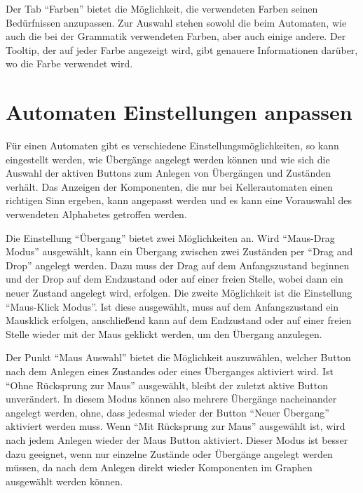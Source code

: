 Der Tab "`Farben"' bietet die Möglichkeit, die verwendeten Farben seinen
Be\-dürf\-nis\-sen anzupassen. Zur Auswahl stehen sowohl die beim Automaten, wie
auch die bei der Grammatik verwendeten Farben, aber auch einige andere. Der
Tooltip, der auf jeder Farbe angezeigt wird, gibt genauere Informationen
darüber, wo die Farbe verwendet wird.


\section{Automaten Einstellungen anpassen}

Für einen Automaten gibt es verschiedene Einstellungsmöglichkeiten, so kann
eingestellt werden, wie Übergänge angelegt werden können und wie sich die
Auswahl der aktiven Buttons zum Anlegen von Übergängen und Zuständen verhält.
Das Anzeigen der Komponenten, die nur bei Kellerautomaten einen richtigen Sinn
ergeben, kann angepasst werden und es kann eine Vorauswahl des verwendeten
Alphabetes getroffen werden.\vspace{10pt}

Die Einstellung "`Übergang"' bietet zwei Möglichkeiten an. Wird "`Maus-Drag Modus"'
ausgewählt, kann ein Übergang zwischen zwei Zuständen per "`Drag and Drop"' angelegt
werden. Dazu muss der Drag auf dem Anfangszustand beginnen und der Drop auf dem
Endzustand oder auf einer freien Stelle, wobei dann ein neuer Zustand angelegt wird,
erfolgen. Die zweite Möglichkeit ist die Einstellung "`Maus-Klick Modus"'. Ist
diese ausgewählt, muss auf dem Anfangszustand ein Mausklick erfolgen,
anschließend kann auf dem Endzustand oder auf einer freien Stelle wieder mit
der Maus geklickt werden, um den Übergang anzulegen.\vspace{10pt}

Der Punkt "`Maus Auswahl"' bietet die Möglichkeit auszuwählen, welcher Button nach
dem Anlegen eines Zustandes oder eines Überganges aktiviert wird. Ist "`Ohne
Rücksprung zur Maus"' ausgewählt, bleibt der zuletzt aktive Button unverändert.
In diesem Modus können also mehrere Übergänge nacheinander angelegt werden, ohne,
dass jedesmal wieder der Button "`Neuer Übergang"' aktiviert werden muss. Wenn
"`Mit Rücksprung zur Maus"' ausgewählt ist, wird nach jedem Anlegen wieder der
Maus Button aktiviert. Dieser Modus ist besser dazu geeignet, wenn nur einzelne
Zustände oder Übergänge angelegt werden müssen, da nach dem Anlegen direkt wieder
Komponenten im Graphen ausgewählt werden können.\vspace{10pt}

